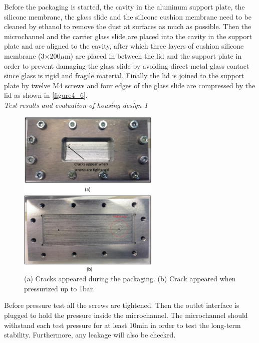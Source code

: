 Before the packaging is started, the cavity in the aluminum support plate, the silicone membrane, the glass slide and the silicone cushion membrane need to be cleaned by ethanol to remove the dust at surfaces as much as possible.  Then the microchannel and the carrier glass slide are placed into the cavity in the support plate and are aligned to the cavity, after which three layers of cushion silicone membrane (3$\times$200$\mu$m) are placed in between the lid and the support plate in order to prevent damaging the glass slide by avoiding direct metal-glass contact since glass is rigid and fragile material. Finally the lid is joined to the support plate by twelve M4 screws and four edges of the glass slide are compressed by the lid as shown in \autoref{figure4_6}.\\


\noindent \textit{Test results and evaluation of housing design 1}\\

\begin{figure}[!b]%
\centering
\includegraphics[width=0.6\textwidth]{figures/packagingandtestunderhighpressure/figure4_7}%
\caption{(a) Cracks appeared during the packaging. (b) Crack appeared when pressurized up to 1bar.}%
\label{figure4_7}%
\end{figure}

Before pressure test all the screws are tightened. Then the outlet interface is plugged to hold the pressure inside the microchannel. The microchannel should withstand each test pressure for at least 10min in order to test the long-term stability. Furthermore, any leakage will also be checked.\\

